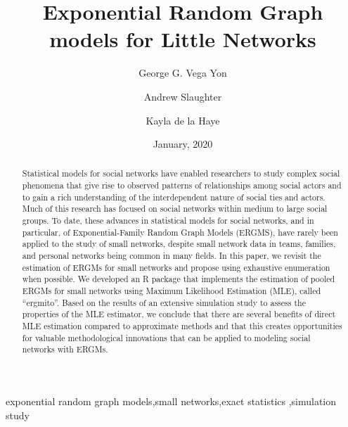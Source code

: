 \documentclass[review, nonatbib,doubleblind]{elsarticle/elsarticle}
\author[1]{George G. Vega Yon\corref{cor1}}
\author[2]{Andrew Slaughter}
\author[1]{Kayla de la Haye}
\title{Exponential Random Graph models for Little Networks\tnoteref{t1}}%
\date{January, 2020}
\begin{document}
\begin{abstract}
    Statistical models for social networks have enabled researchers to study complex social phenomena that give rise to observed patterns of relationships among social actors and to gain a rich understanding of the interdependent nature of social ties and actors. Much of this research has focused on social networks within medium to large social groups. To date, these advances in statistical models for social networks, and in particular, of Exponential-Family Random Graph Models (ERGMS), have rarely been applied to the study of small networks, despite small network data in teams, families, and personal networks being common in many fields. In this paper, we revisit the estimation of ERGMs for small networks and propose using exhaustive enumeration when possible. We developed an R package that implements the estimation of pooled ERGMs for small networks using Maximum Likelihood Estimation (MLE), called ``ergmito''. Based on the results of an extensive simulation study to assess the properties of the MLE estimator, we conclude that there are several benefits of direct MLE estimation compared to approximate methods and that this creates opportunities for valuable methodological innovations that can be applied to modeling social networks with ERGMs.
\end{abstract}

\begin{keyword}
exponential random graph models\sep small networks\sep exact statistics \sep simulation study
\end{keyword}

\maketitle

% 
% 
\end{document}
